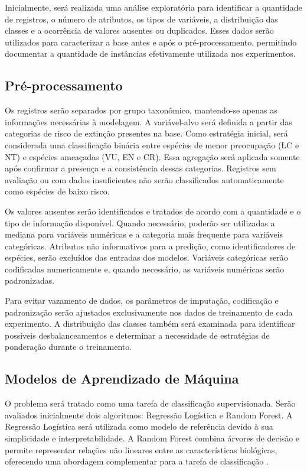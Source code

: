 \documentclass[conference]{IEEEtran}
\begin{document}
Inicialmente, será realizada uma análise exploratória para identificar a quantidade de registros, o número de atributos, os tipos de variáveis, a distribuição das classes e a ocorrência de valores ausentes ou duplicados. Esses dados serão utilizados para caracterizar a base antes e após o pré-processamento, permitindo documentar a quantidade de instâncias efetivamente utilizada nos experimentos.

\subsection{Pré-processamento}

Os registros serão separados por grupo taxonômico, mantendo-se apenas as informações necessárias à modelagem. A variável-alvo será definida a partir das categorias de risco de extinção presentes na base. Como estratégia inicial, será considerada uma classificação binária entre espécies de menor preocupação (LC e NT) e espécies ameaçadas (VU, EN e CR). Essa agregação será aplicada somente após confirmar a presença e a consistência dessas categorias. Registros sem avaliação ou com dados insuficientes não serão classificados automaticamente como espécies de baixo risco.

Os valores ausentes serão identificados e tratados de acordo com a quantidade e o tipo de informação disponível. Quando necessário, poderão ser utilizadas a mediana para variáveis numéricas e a categoria mais frequente para variáveis categóricas. Atributos não informativos para a predição, como identificadores de espécies, serão excluídos das entradas dos modelos. Variáveis categóricas serão codificadas numericamente e, quando necessário, as variáveis numéricas serão padronizadas.

Para evitar vazamento de dados, os parâmetros de imputação, codificação e padronização serão ajustados exclusivamente nos dados de treinamento de cada experimento. A distribuição das classes também será examinada para identificar possíveis desbalanceamentos e determinar a necessidade de estratégias de ponderação durante o treinamento.

\subsection{Modelos de Aprendizado de Máquina}

O problema será tratado como uma tarefa de classificação supervisionada. Serão avaliados inicialmente dois algoritmos: Regressão Logística e Random Forest. A Regressão Logística será utilizada como modelo de referência devido à sua simplicidade e interpretabilidade. A Random Forest combina árvores de decisão e permite representar relações não lineares entre as características biológicas, oferecendo uma abordagem complementar para a tarefa de classificação \cite{b11,b12}.
\end{document}
